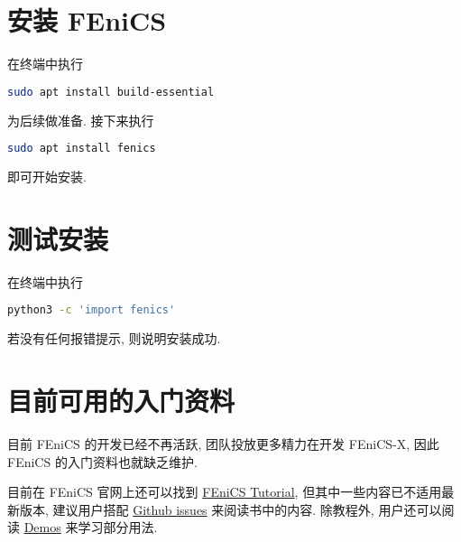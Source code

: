 \documentclass[fontset=founder]{ctexart}
\begin{document}
\section{安装 FEniCS}

在终端中执行
\begin{lstlisting}[language = bash]
  sudo apt install build-essential
\end{lstlisting}
为后续做准备.
接下来执行
\begin{lstlisting}[language = bash]
  sudo apt install fenics
\end{lstlisting}
即可开始安装.

\section{测试安装}

在终端中执行
\begin{lstlisting}[language = bash]
  python3 -c 'import fenics'
\end{lstlisting}
若没有任何报错提示,
则说明安装成功.

\section{目前可用的入门资料}

目前 FEniCS 的开发已经不再活跃,
团队投放更多精力在开发 FEniCS-X,
因此 FEniCS 的入门资料也就缺乏维护.

目前在 FEniCS 官网上还可以找到
\href{https://fenicsproject.org/tutorial/}{FEniCS Tutorial},
但其中一些内容已不适用最新版本,
建议用户搭配 \href{https://github.com/hplgit/fenics-tutorial/issues}{Github issues}
来阅读书中的内容.
除教程外,
用户还可以阅读
\href{https://fenicsproject.org/olddocs/dolfin/latest/python/demos.html}{Demos}
来学习部分用法.
\end{document}
